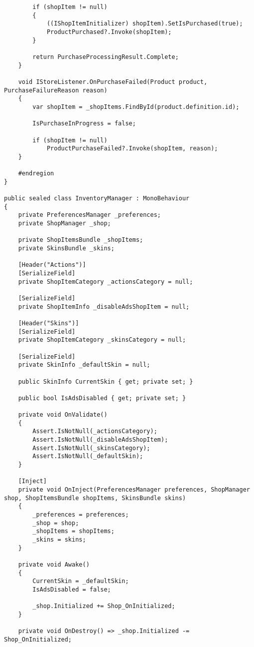 \begin{lstlisting}
        if (shopItem != null)
        {
            ((IShopItemInitializer) shopItem).SetIsPurchased(true);
            ProductPurchased?.Invoke(shopItem);
        }

        return PurchaseProcessingResult.Complete;
    }

    void IStoreListener.OnPurchaseFailed(Product product, PurchaseFailureReason reason)
    {
        var shopItem = _shopItems.FindById(product.definition.id);

        IsPurchaseInProgress = false;

        if (shopItem != null)
            ProductPurchaseFailed?.Invoke(shopItem, reason);
    }

    #endregion
}

public sealed class InventoryManager : MonoBehaviour
{
    private PreferencesManager _preferences;
    private ShopManager _shop;

    private ShopItemsBundle _shopItems;
    private SkinsBundle _skins;

    [Header("Actions")]
    [SerializeField]
    private ShopItemCategory _actionsCategory = null;

    [SerializeField]
    private ShopItemInfo _disableAdsShopItem = null;

    [Header("Skins")]
    [SerializeField]
    private ShopItemCategory _skinsCategory = null;

    [SerializeField]
    private SkinInfo _defaultSkin = null;

    public SkinInfo CurrentSkin { get; private set; }

    public bool IsAdsDisabled { get; private set; }

    private void OnValidate()
    {
        Assert.IsNotNull(_actionsCategory);
        Assert.IsNotNull(_disableAdsShopItem);
        Assert.IsNotNull(_skinsCategory);
        Assert.IsNotNull(_defaultSkin);
    }

    [Inject]
    private void OnInject(PreferencesManager preferences, ShopManager shop, ShopItemsBundle shopItems, SkinsBundle skins)
    {
        _preferences = preferences;
        _shop = shop;
        _shopItems = shopItems;
        _skins = skins;
    }

    private void Awake()
    {
        CurrentSkin = _defaultSkin;
        IsAdsDisabled = false;

        _shop.Initialized += Shop_OnInitialized;
    }

    private void OnDestroy() => _shop.Initialized -= Shop_OnInitialized;


\end{lstlisting}

